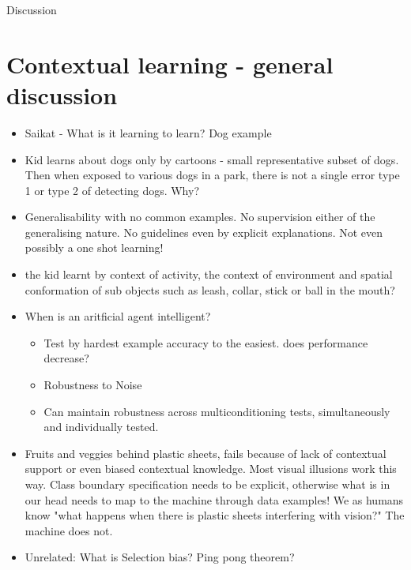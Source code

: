 Discussion


\section{Contextual learning - general discussion}
\begin{itemize}
\item Saikat - What is it learning to learn? Dog example
\item Kid learns about dogs only by cartoons - small representative subset of dogs. Then when exposed to various dogs in a park, there is not a single error type 1 or type 2 of detecting dogs. Why?
\item Generalisability with no common examples. No supervision either of the generalising nature. No guidelines even by explicit explanations. Not even possibly a one shot learning!
\item the kid learnt by context of activity, the context of environment and spatial conformation of sub objects such as leash, collar, stick or ball in the mouth?
\item When is an aritficial agent intelligent?
\begin{itemize}
\item Test by hardest example accuracy to the easiest. does performance decrease?
\item Robustness to Noise
\item Can maintain robustness across multiconditioning tests, simultaneously and individually tested.
\end{itemize}
\item Fruits and veggies behind plastic sheets, fails because of lack of contextual support or even biased contextual knowledge. Most visual illusions work this way. Class boundary specification needs to be explicit, otherwise what is in our head needs to map to the machine through data examples! We as humans know "what happens when there is plastic sheets interfering with vision?" The machine does not.
\item Unrelated: What is Selection bias? Ping pong theorem?
\end{itemize}
